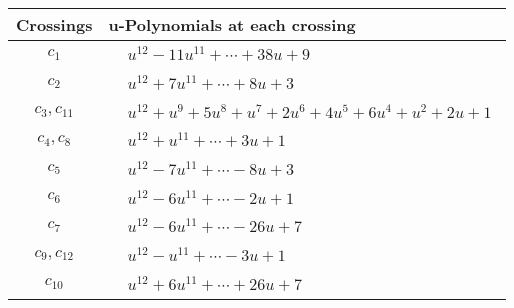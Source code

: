 \documentclass[1p]{elsarticle_modified}
\theoremstyle{definition}
\begin{document}
\begin{tabular}{m{50pt}|m{274pt}}
Crossings & \hspace{64pt}u-Polynomials at each crossing \\
\hline $$\begin{aligned}c_{1}\end{aligned}$$&$\begin{aligned}
&u^{12}-11 u^{11}+\cdots+38 u+9
\end{aligned}$\\
\hline $$\begin{aligned}c_{2}\end{aligned}$$&$\begin{aligned}
&u^{12}+7 u^{11}+\cdots+8 u+3
\end{aligned}$\\
\hline $$\begin{aligned}c_{3},c_{11}\end{aligned}$$&$\begin{aligned}
&u^{12}+u^9+5 u^8+u^7+2 u^6+4 u^5+6 u^4+u^2+2 u+1
\end{aligned}$\\
\hline $$\begin{aligned}c_{4},c_{8}\end{aligned}$$&$\begin{aligned}
&u^{12}+u^{11}+\cdots+3 u+1
\end{aligned}$\\
\hline $$\begin{aligned}c_{5}\end{aligned}$$&$\begin{aligned}
&u^{12}-7 u^{11}+\cdots-8 u+3
\end{aligned}$\\
\hline $$\begin{aligned}c_{6}\end{aligned}$$&$\begin{aligned}
&u^{12}-6 u^{11}+\cdots-2 u+1
\end{aligned}$\\
\hline $$\begin{aligned}c_{7}\end{aligned}$$&$\begin{aligned}
&u^{12}-6 u^{11}+\cdots-26 u+7
\end{aligned}$\\
\hline $$\begin{aligned}c_{9},c_{12}\end{aligned}$$&$\begin{aligned}
&u^{12}- u^{11}+\cdots-3 u+1
\end{aligned}$\\
\hline $$\begin{aligned}c_{10}\end{aligned}$$&$\begin{aligned}
&u^{12}+6 u^{11}+\cdots+26 u+7
\end{aligned}$\\
\hline
\end{tabular}\\~\\
\end{document}
